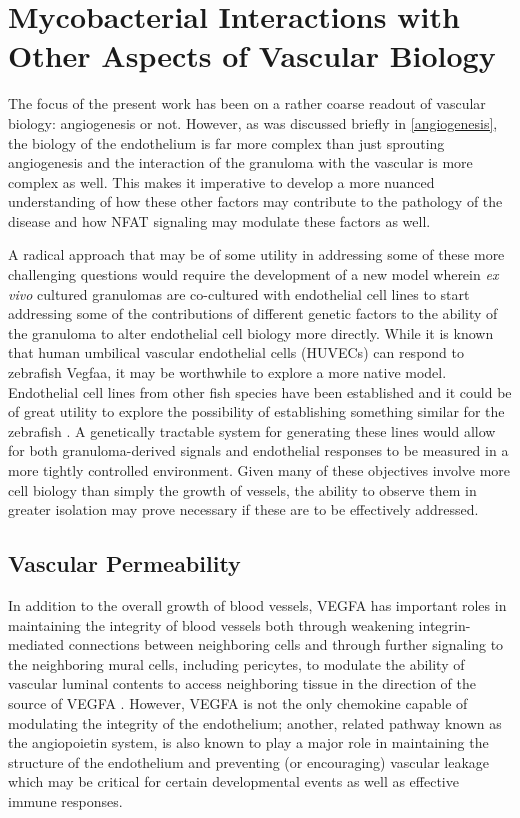 \section{Mycobacterial Interactions with Other Aspects of Vascular Biology}\label{othervasc}

The focus of the present work has been on a rather coarse readout of vascular biology: angiogenesis or not. However, as was discussed briefly in \autoref{angiogenesis}, the biology of the endothelium is far more complex than just sprouting angiogenesis and the interaction of the granuloma with the vascular is more complex as well. This makes it imperative to develop a more nuanced understanding of how these other factors may contribute to the pathology of the disease and how NFAT signaling may modulate these factors as well. 

A radical approach that may be of some utility in addressing some of these more challenging questions would require the development of a new model wherein \textit{ex vivo} cultured granulomas are co\hyp{}cultured with endothelial cell lines to start addressing some of the contributions of different genetic factors to the ability of the granuloma to alter endothelial cell biology more directly. While it is known that human umbilical vascular endothelial cells (HUVECs) can respond to zebrafish Vegfaa, it may be worthwhile to explore a more native model. Endothelial cell lines from other fish species have been established and it could be of great utility to explore the possibility of establishing something similar for the zebrafish \citep{Pham2017, Luque2014}. A genetically tractable system for generating these lines would allow for both granuloma\hyp{}derived signals and endothelial responses to be measured in a more tightly controlled environment. Given many of these objectives involve more cell biology than simply the growth of vessels, the ability to observe them in greater isolation may prove necessary if these are to be effectively addressed.

\subsection{Vascular Permeability}\label{permeability}

In addition to the overall growth of blood vessels, VEGFA has important roles in maintaining the integrity of blood vessels both through weakening integrin\hyp{}mediated connections between neighboring cells and through further signaling to the neighboring mural cells, including pericytes, to modulate the ability of vascular luminal contents to access neighboring tissue in the direction of the source of VEGFA \citep{ParkWindhol2016, ClaessonWelsh2015}. However, VEGFA is not the only chemokine capable of modulating the integrity of the endothelium; another, related pathway known as the angiopoietin system, is also known to play a major role in maintaining the structure of the endothelium and preventing (or encouraging) vascular leakage which may be critical for certain developmental events as well as effective immune responses.

